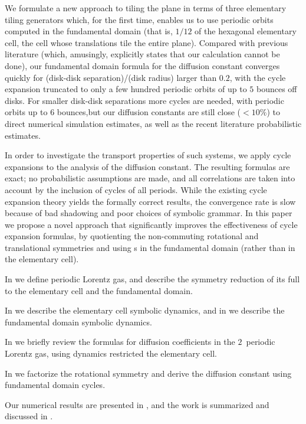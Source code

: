We formulate a new approach to tiling the plane in terms of three elementary
tiling generators which, for the first time, enables us to use periodic orbits
computed in the fundamental domain (that is, $1/12$ of the hexagonal elementary
cell, the cell whose translations tile the entire plane). Compared with previous
literature (which, amusingly, explicitly states that our calculation cannot be
done), our fundamental domain formula for the diffusion constant converges quickly
for (disk-disk separation)/(disk radius) larger than $0.2$, with the cycle expansion
truncated to only a few hundred periodic orbits of up to $5$ bounces off disks.
For smaller disk-disk separations more cycles are needed, with periodic orbits up
to $6$ bounces,but our diffusion constants are still close ($<10\%$) to direct
numerical simulation estimates, as well as the recent literature probabilistic
estimates.

In order to investigate the transport properties of such systems, we apply cycle
expansions to the analysis of the {diffusion constant}.
The resulting formulas are exact; no probabilistic assumptions are made,
and all correlations are taken into account by the  inclusion of cycles
of all periods.
While the existing cycle expansion theory yields the formally correct
results, the convergence rate is slow because of bad shadowing and poor choices
of symbolic grammar. In this paper we propose a novel approach that
significantly improves the effectiveness of cycle expansion formulas, by
quotienting the non-commuting rotational and translational symmetries and using
\po s in the fundamental domain (rather than in the elementary cell).


In 
we define periodic Lorentz gas, and describe the symmetry reduction of its full
{\statesp} to the elementary cell and the fundamental domain.

In  we describe the elementary cell symbolic dynamics,
and in
 we describe the fundamental domain symbolic dynamics.

In 
we briefly review the formulas for diffusion coefficients in the $2$\dmn\
periodic Lorentz gas, using dynamics restricted the elementary cell.

In 
we factorize the rotational symmetry and derive the diffusion constant using
fundamental domain cycles.

Our numerical results are presented
in ,
and the work  is summarized and discussed
in  .
